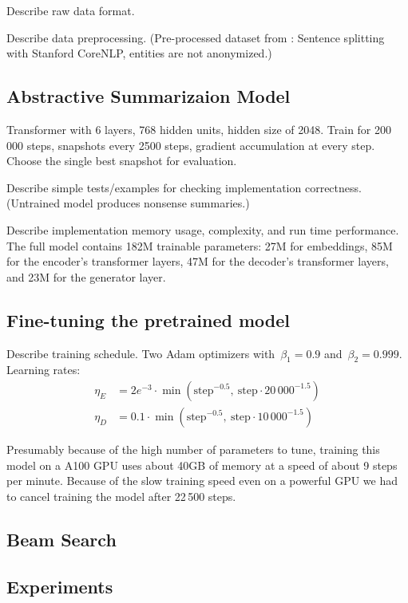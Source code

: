 Describe raw data format.

Describe data preprocessing. (Pre-processed dataset from \citeauthor{LiuL2019}: Sentence splitting  with Stanford CoreNLP, entities are not anonymized.)

\subsection{Abstractive Summarizaion Model}

Transformer with 6 layers, 768 hidden units, hidden size of 2048.
Train for 200\,000 steps, snapshots every 2500 steps, gradient accumulation at every step.
Choose the single best snapshot for evaluation.

Describe simple tests/examples for checking implementation correctness. (Untrained model produces nonsense summaries.)

Describe implementation memory usage, complexity, and run time performance.
The full \BertSumAbs model contains 182M trainable parameters: 27M for embeddings, 85M for the encoder's transformer layers, 47M for the decoder's transformer layers, and 23M for the generator layer.

\subsection{Fine-tuning the pretrained model}

Describe training schedule.
Two Adam optimizers with~\(\beta_1 = 0.9\) and~\(\beta_2 = 0.999\).
Learning rates:
\begin{align}
    \eta_E &= 2e^{-3} \cdot \min( \text{step}^{-0.5},\ \text{step} \cdot 20\,000^{-1.5} ) \\
    \eta_D &= 0.1 \cdot \min( \text{step}^{-0.5},\ \text{step} \cdot 10\,000^{-1.5} )
\end{align}

Presumably because of the high number of parameters to tune, training this \BertSumAbs model on a A100 GPU uses about 40GB of memory at a speed of about 9 steps per minute.
Because of the slow training speed even on a powerful GPU we had to cancel training the model after 22\,500 steps.

\subsection{Beam Search}

\subsection{Experiments}

